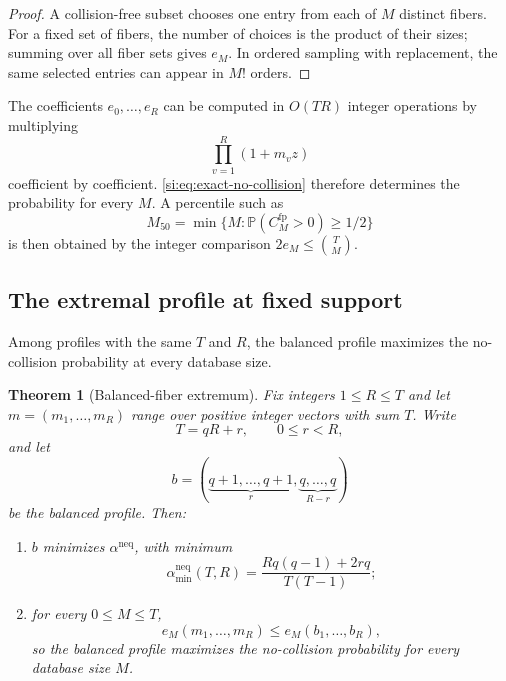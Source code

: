 \documentclass[9pt,twoside]{pnas-new}
\newtheorem{theorem}{Theorem}
\theoremstyle{definition}
\theoremstyle{remark}
\renewcommand{\Pr}{\mathbb{P}}
\newcommand{\neqp}{\mathrm{neq}}
\begin{document}
\begin{proof}
A collision-free subset chooses one entry from each of $M$ distinct fibers.  For a fixed set of fibers, the number of choices is the product of their sizes; summing over all fiber sets gives $e_M$.  In ordered sampling with replacement, the same selected entries can appear in $M!$ orders.
\end{proof}

The coefficients $e_0,\ldots,e_R$ can be computed in $O(TR)$ integer operations by multiplying
\[
 \prod_{v=1}^R(1+m_vz)
\]
coefficient by coefficient.  \eqref{si:eq:exact-no-collision} therefore determines the probability for every $M$.  A percentile such as
\[
 M_{50}=\min\{M:\Pr(C_M^{\mathrm{fp}}>0)\ge1/2\}
\]
is then obtained by the integer comparison
$2e_M\le\binom TM$.

\subsection{The extremal profile at fixed support}
Among profiles with the same $T$ and $R$, the balanced profile maximizes the no-collision probability at every database size.

\begin{theorem}[Balanced-fiber extremum]
\label{si:thm:balanced-extremum}
Fix integers $1\le R\le T$ and let $m=(m_1,\ldots,m_R)$ range over positive integer vectors with sum $T$.  Write
\[
 T=qR+r,
 \qquad
 0\le r<R,
\]
and let
\[
 b=(\underbrace{q+1,\ldots,q+1}_{r},
    \underbrace{q,\ldots,q}_{R-r})
\]
be the balanced profile.  Then:
\begin{enumerate}[label=(\roman*)]
 \item $b$ minimizes $\alpha^{\neqp}$, with minimum
 \begin{equation}
  \alpha_{\min}^{\neqp}(T,R)
  =\frac{Rq(q-1)+2rq}{T(T-1)};
  \label{si:eq:exact-balanced-min}
 \end{equation}
 \item for every $0\le M\le T$,
 \begin{equation}
  e_M(m_1,\ldots,m_R)
  \le e_M(b_1,\ldots,b_R),
  \label{si:eq:balanced-emax}
 \end{equation}
 so the balanced profile maximizes the no-collision probability for every database size $M$.
\end{enumerate}
\end{theorem}
\end{document}
